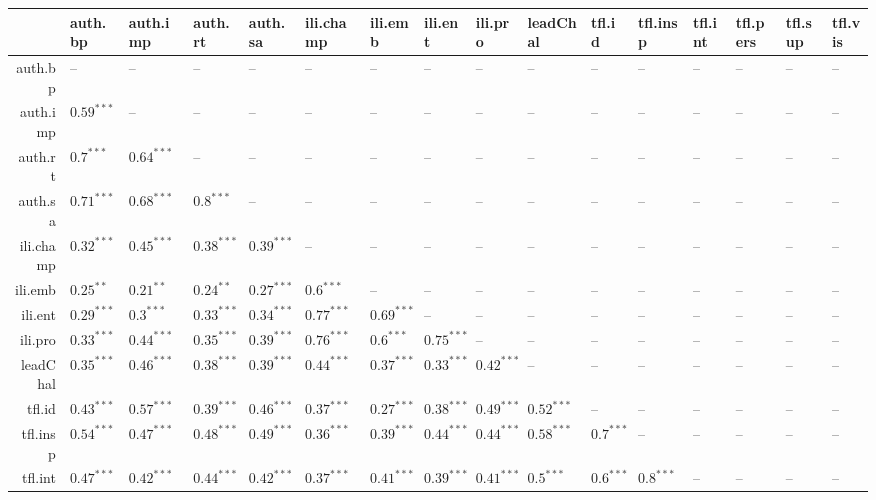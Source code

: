 \begin{table}[ht]
\centering
\begin{tabular}{rlllllllllllllll}
  \hline
 & auth.bp & auth.imp & auth.rt & auth.sa & ili.champ & ili.emb & ili.ent & ili.pro & leadChal & tfl.id & tfl.insp & tfl.int & tfl.pers & tfl.sup & tfl.vis \\ 
  \hline
auth.bp & -- & -- & -- & -- & -- & -- & -- & -- & -- & -- & -- & -- & -- & -- & -- \\ 
  auth.imp & $0.59^{***}$ & -- & -- & -- & -- & -- & -- & -- & -- & -- & -- & -- & -- & -- & -- \\ 
  auth.rt & $0.7^{***}$ & $0.64^{***}$ & -- & -- & -- & -- & -- & -- & -- & -- & -- & -- & -- & -- & -- \\ 
  auth.sa & $0.71^{***}$ & $0.68^{***}$ & $0.8^{***}$ & -- & -- & -- & -- & -- & -- & -- & -- & -- & -- & -- & -- \\ 
  ili.champ & $0.32^{***}$ & $0.45^{***}$ & $0.38^{***}$ & $0.39^{***}$ & -- & -- & -- & -- & -- & -- & -- & -- & -- & -- & -- \\ 
  ili.emb & $0.25^{**}$ & $0.21^{**}$ & $0.24^{**}$ & $0.27^{***}$ & $0.6^{***}$ & -- & -- & -- & -- & -- & -- & -- & -- & -- & -- \\ 
  ili.ent & $0.29^{***}$ & $0.3^{***}$ & $0.33^{***}$ & $0.34^{***}$ & $0.77^{***}$ & $0.69^{***}$ & -- & -- & -- & -- & -- & -- & -- & -- & -- \\ 
  ili.pro & $0.33^{***}$ & $0.44^{***}$ & $0.35^{***}$ & $0.39^{***}$ & $0.76^{***}$ & $0.6^{***}$ & $0.75^{***}$ & -- & -- & -- & -- & -- & -- & -- & -- \\ 
  leadChal & $0.35^{***}$ & $0.46^{***}$ & $0.38^{***}$ & $0.39^{***}$ & $0.44^{***}$ & $0.37^{***}$ & $0.33^{***}$ & $0.42^{***}$ & -- & -- & -- & -- & -- & -- & -- \\ 
  tfl.id & $0.43^{***}$ & $0.57^{***}$ & $0.39^{***}$ & $0.46^{***}$ & $0.37^{***}$ & $0.27^{***}$ & $0.38^{***}$ & $0.49^{***}$ & $0.52^{***}$ & -- & -- & -- & -- & -- & -- \\ 
  tfl.insp & $0.54^{***}$ & $0.47^{***}$ & $0.48^{***}$ & $0.49^{***}$ & $0.36^{***}$ & $0.39^{***}$ & $0.44^{***}$ & $0.44^{***}$ & $0.58^{***}$ & $0.7^{***}$ & -- & -- & -- & -- & -- \\ 
  tfl.int & $0.47^{***}$ & $0.42^{***}$ & $0.44^{***}$ & $0.42^{***}$ & $0.37^{***}$ & $0.41^{***}$ & $0.39^{***}$ & $0.41^{***}$ & $0.5^{***}$ & $0.6^{***}$ & $0.8^{***}$ & -- & -- & -- & -- \\ 

\end{tabular}
\end{table}
